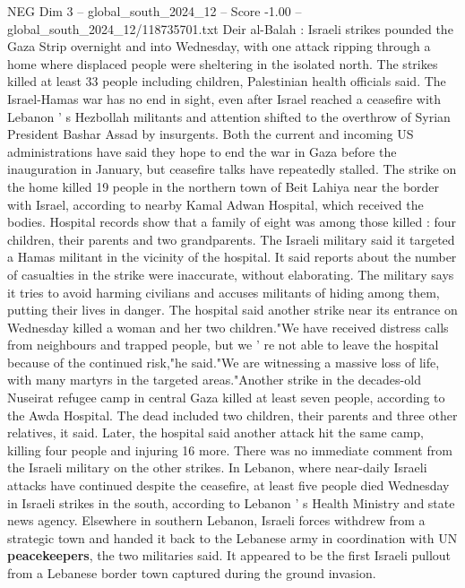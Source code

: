 \begin{textsample}{NEG Dim 3 – global\_south\_2024\_12 – Score -1.00 – global\_south\_2024\_12/118735701.txt}  \label{ex:f3_neg_061}
Deir al-Balah : Israeli strikes pounded the Gaza Strip overnight and into Wednesday, with one attack ripping through a home where displaced people were sheltering in the isolated north.
The strikes killed at least 33 people including children, Palestinian health officials said.
The Israel-Hamas war has no end in sight, even after Israel reached a ceasefire with Lebanon ' s Hezbollah militants and attention shifted to the overthrow of Syrian President Bashar Assad by insurgents.
Both the current and incoming US administrations have said they hope to end the war in Gaza before the inauguration in January, but ceasefire talks have repeatedly stalled.
The strike on the home killed 19 people in the northern town of Beit Lahiya near the border with Israel, according to nearby Kamal Adwan Hospital, which received the bodies.
Hospital records show that a family of eight was among those killed : four children, their parents and two grandparents.
The Israeli military said it targeted a Hamas militant in the vicinity of the hospital.
It said reports about the number of casualties in the strike were inaccurate, without elaborating.
The military says it tries to avoid harming civilians and accuses militants of hiding among them, putting their lives in danger.
The hospital said another strike near its entrance on Wednesday killed a woman and her two children."We have received distress calls from neighbours and trapped people, but we ' re not able to leave the hospital because of the continued risk,"he said."We are witnessing a massive loss of life, with many martyrs in the targeted areas."Another strike in the decades-old Nuseirat refugee camp in central Gaza killed at least seven people, according to the Awda Hospital.
The dead included two children, their parents and three other relatives, it said.
Later, the hospital said another attack hit the same camp, killing four people and injuring 16 more.
There was no immediate comment from the Israeli military on the other strikes.
In Lebanon, where near-daily Israeli attacks have continued despite the ceasefire, at least five people died Wednesday in Israeli strikes in the south, according to Lebanon ' s Health Ministry and state news agency.
Elsewhere in southern Lebanon, Israeli forces withdrew from a strategic town and handed it back to the Lebanese army in coordination with UN \textbf{peacekeepers}, the two militaries said.
It appeared to be the first Israeli pullout from a Lebanese border town captured during the ground invasion.

\end{textsample}
